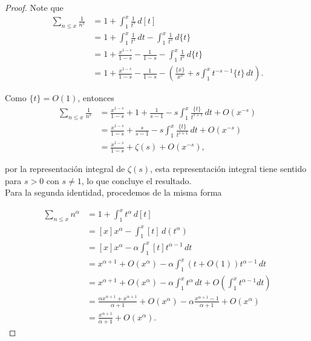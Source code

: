 \documentclass[12pt, a4paper]{article}
\begin{document}
\begin{proof}
	Note que
	\begin{align*}
		\sum_{n \le x} \frac{1}{n^s}
		 & = 1 + \int_1^x \frac{1}{t^s} \, d[t]                                         \\
		 & = 1 + \int_1^x \frac{1}{t^s} \, dt - \int_1^x \frac{1}{t^s} \, d\{t\}        \\
		 & = 1 + \frac{x^{1-s}}{1-s} - \frac{1}{1-s} - \int_1^x \frac{1}{t^s} \, d\{t\} \\
		 & = 1 + \frac{x^{1-s}}{1-s} - \frac{1}{1-s}
		- \left( \frac{\{x\}}{x^s} + s \int_1^x t^{-s-1} \{t\} \, dt \right).
	\end{align*}

	Como $\{t\} = O(1)$, entonces
	\begin{align*}
		\sum_{n \le x} \frac{1}{n^s}
		 & = \frac{x^{1-s}}{1-s} + 1 + \frac{1}{s-1}
		- s \int_1^x \frac{\{t\}}{t^{s+1}} \, dt + O(x^{-s}) \\
		 & = \frac{x^{1-s}}{1-s} + \frac{s}{s-1}
		- s \int_1^x \frac{\{t\}}{t^{s+1}} \, dt + O(x^{-s}) \\
		 & = \frac{x^{1-s}}{1-s} + \zeta(s) + O(x^{-s}),
	\end{align*}

	por la representación integral de $\zeta(s)$, esta representación integral tiene sentido para $s > 0$
	con $s \neq 1$, lo que concluye el resultado.\\

	Para la segunda identidad, procedemos de la misma forma

	\begin{align*}
		\sum_{n \le x} n^{\alpha}
		 & = 1 + \int_1^x t^\alpha \, d[t]                                                                                        \\
		 & = [x]x^\alpha - \int_1^x [t] \, d(t^\alpha)                                                                            \\
		 & = [x]x^\alpha - \alpha \int_1^x [t] t^{\alpha-1} \, dt                                                                 \\
		 & = x^{\alpha+1} + O(x^\alpha)
		- \alpha \int_1^x (t + O(1)) t^{\alpha-1} \, dt                                                                           \\
		 & = x^{\alpha+1} + O(x^\alpha)
		- \alpha \int_1^x t^\alpha \, dt
		+ O\!\left(\int_1^x t^{\alpha-1} dt\right)                                                                                \\
		 & = \frac{\alpha x^{\alpha+1}+x^{\alpha+1} }{\alpha+1}+ O(x^\alpha)- \alpha \frac{x^{\alpha+1}-1}{\alpha+1}+ O(x^\alpha) \\
		 & = \frac{x^{\alpha+1}}{\alpha+1} + O(x^\alpha).
	\end{align*}
\end{proof}
\end{document}
